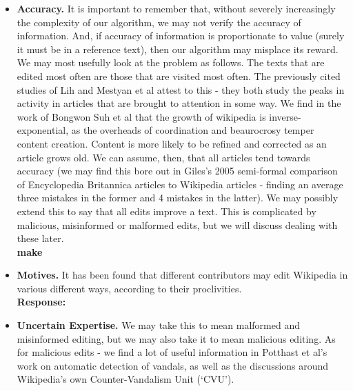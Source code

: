 \documentclass[a4paper,11pt,twoside,notitlepage]{article}
\begin{document}
        \begin{itemize}
          \item \textbf{Accuracy.} It is important to remember that,
            without severely increasingly the complexity of our
            algorithm, we may not verify the accuracy of
            information. And, if accuracy of information is
            proportionate to value (surely it must be in a reference
            text), then our algorithm may misplace its reward. We may
            most usefully look at the problem as follows. The texts that
            are edited most often are those that are visited most
            often. The previously cited studies of Lih and Mestyan et al
            attest to this - they both study the peaks in activity in
            articles that are brought to attention in some way. We
            find in the work of Bongwon Suh et al that the growth of
            wikipedia is inverse-exponential, as the overheads of
            coordination and beaurocrosy temper content
            creation.\cite{Suh2009}\cite{Kittur2007} Content is more
            likely to be refined and corrected as an article grows
            old.\cite{Wilkinson2007} We can assume, then, that all
            articles tend towards accuracy (we may find this bore out
            in Giles's 2005 semi-formal comparison of Encyclopedia
            Britannica articles to Wikipedia articles - finding an
            average three mistakes in the former and 4 mistakes in the
            latter)\cite{Giles2005}. We may possibly extend this to
            say that all edits improve a text. This is complicated by
            malicious, misinformed or malformed edits, but we will
            discuss dealing with these later.\\
            \textbf{make}
          \item \textbf{Motives.} It has been found that different
            contributors may edit Wikipedia in various different ways,
            according to their proclivities.\\
            \textbf{Response:}
          \item \textbf{Uncertain Expertise.} We may take this to mean
            malformed and misinformed editing, but we may also take it
            to mean malicious editing. As for malicious edits - we
            find a lot of useful information in Potthast et al's work
            on automatic detection of vandals,\cite{Potthast2008} as
            well as the discussions around Wikipedia's own
            Counter-Vandalism Unit (`CVU').\cite{wiki-vandalism}

\end{itemize}
\end{document}
